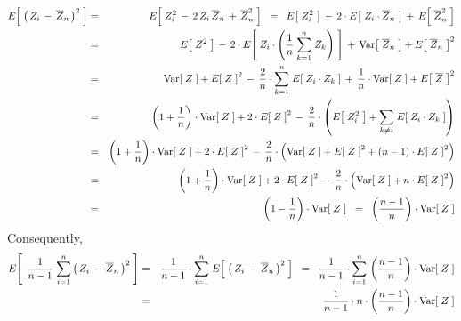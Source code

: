 \begin{enumerate}
	\begin{eqnarray*}
	E\!\left[\;\left(\,Z_{i} \,-\, \overline{Z}_{n}\,\right)^{2}\;\right]
	& = &
		E\!\left[\;Z_{i}^{2} \,-\, 2\,Z_{i}\,\overline{Z}_{n} \,+\, \overline{Z}_{n}^{2}\;\right]
	\;\; = \;\;
		E\!\left[\;Z_{i}^{2}\;\right]
		\,-\, 2 \cdot E\!\left[\;Z_{i}\cdot\overline{Z}_{n}\;\right]
		\,+\, E\!\left[\;\overline{Z}_{n}^{2}\;\right]
	\\
	& = &
		E\!\left[\;Z^{2}\;\right]
		\,-\, 2 \cdot E\!\left[\;Z_{i}\cdot\left(\dfrac{1}{n}\;\overset{n}{\underset{k=1}{\sum}}\;Z_{k}\right)\;\right]
		\,+\, \Var\!\left[\;\overline{Z}_{n}\;\right] + E\!\left[\;\overline{Z}_{n}\;\right]^{2}
	\\
	& = &
		\Var\!\left[\;Z\;\right] + E\!\left[\;Z\;\right]^{2}
		\,-\, \dfrac{2}{n} \cdot \overset{n}{\underset{k=1}{\sum}} \; E\!\left[\;Z_{i} \cdot Z_{k}\;\right]
		\,+\, \dfrac{1}{n}\cdot\Var\!\left[\;Z\;\right] + E\!\left[\;\overline{Z}\;\right]^{2}
	\\
	& = &
		\left(1+\dfrac{1}{n}\right)\cdot\Var\!\left[\;Z\;\right] + 2 \cdot E\!\left[\;Z\;\right]^{2}
		\,-\, \dfrac{2}{n} \cdot \left(
			E\!\left[\;Z_{i}^{2}\;\right] + \underset{k \neq i}{\sum} \; E\!\left[\;Z_{i} \cdot Z_{k}\;\right]
			\right)
	\\
	& = &
		\left(1+\dfrac{1}{n}\right)\cdot\Var\!\left[\;Z\;\right] + 2 \cdot E\!\left[\;Z\;\right]^{2}
		\,-\, \dfrac{2}{n} \cdot \left(
			\Var\!\left[\;Z\;\right] + E\!\left[\;Z\;\right]^{2} + (n-1)\cdot E\!\left[\;Z\;\right]^{2}
			\right)
	\\
	& = &
		\left(1+\dfrac{1}{n}\right)\cdot\Var\!\left[\;Z\;\right] + 2 \cdot E\!\left[\;Z\;\right]^{2}
		\,-\, \dfrac{2}{n} \cdot \left(
			\Var\!\left[\;Z\;\right] + n\cdot E\!\left[\;Z\;\right]^{2}
			\right)
	\\
	& = &
		\left(1-\dfrac{1}{n}\right)\cdot\Var\!\left[\;Z\;\right]
	\;\; = \;\;
		\left(\dfrac{n-1}{n}\right)\cdot\Var\!\left[\;Z\;\right]
	\end{eqnarray*}
	Consequently,
	\begin{eqnarray*}
	E\!\left[\;\,\dfrac{1}{n-1}\;\overset{n}{\underset{i=1}{\sum}}\left(\,Z_{i} \,-\, \overline{Z}_{n}\,\right)^{2}\;\right]
	&=&
		\dfrac{1}{n-1}\cdot
		\overset{n}{\underset{i=1}{\sum}}\;E\!\left[\;\left(\,Z_{i} \,-\, \overline{Z}_{n}\,\right)^{2}\;\right]
	\;\; = \;\;
		\dfrac{1}{n-1}\cdot
		\overset{n}{\underset{i=1}{\sum}}\,\left(\dfrac{n-1}{n}\right)\cdot\Var\!\left[\;Z\;\right]
	\\
	&=&
		\dfrac{1}{n-1} \cdot n \cdot \left(\dfrac{n-1}{n}\right)\cdot\Var\!\left[\;Z\;\right]

\end{eqnarray*}
\end{enumerate}
